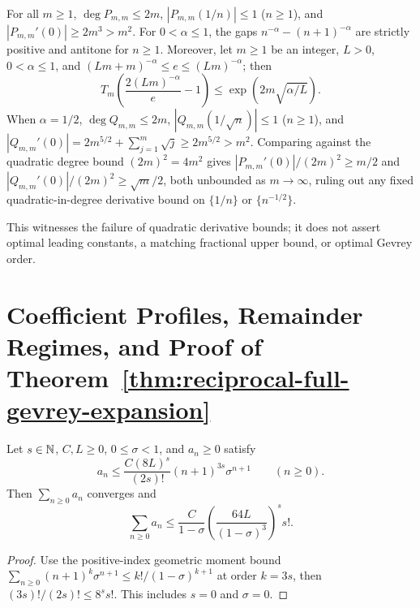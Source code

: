\begin{theorem}
\label{thm:fractional-sharpness}
\leanok
For all $m \ge 1$, $\deg P_{m,m} \le 2m$, $|P_{m,m}(1/n)| \le 1$ ($n \ge 1$), and $|P_{m,m}'(0)| \ge 2m^3 > m^2$. For $0 < \alpha \le 1$, the gaps $n^{-\alpha} - (n+1)^{-\alpha}$ are strictly positive and antitone for $n \ge 1$. Moreover, let $m \ge 1$ be an integer, $L > 0$, $0 < \alpha \le 1$, and $(Lm + m)^{-\alpha} \le e \le (Lm)^{-\alpha}$; then
\[
  T_m\!\left(\frac{2(Lm)^{-\alpha}}{e} - 1\right) \le \exp\!\left(2m\sqrt{\alpha/L}\right).
\]
When $\alpha = 1/2$, $\deg Q_{m,m} \le 2m$, $|Q_{m,m}(1/\sqrt{n})| \le 1$ ($n \ge 1$), and $|Q_{m,m}'(0)| = 2m^{5/2} + \sum_{j=1}^m \sqrt{j} \ge 2m^{5/2} > m^2$. Comparing against the quadratic degree bound $(2m)^2 = 4m^2$ gives $|P_{m,m}'(0)| / (2m)^2 \ge m/2$ and $|Q_{m,m}'(0)| / (2m)^2 \ge \sqrt{m}/2$, both unbounded as $m \to \infty$, ruling out any fixed quadratic-in-degree derivative bound on $\{1/n\}$ or $\{n^{-1/2}\}$.
\end{theorem}

This witnesses the failure of quadratic derivative bounds; it does not assert optimal leading constants, a matching fractional upper bound, or optimal Gevrey order.

\section{Coefficient Profiles, Remainder Regimes, and Proof of Theorem~\ref{thm:reciprocal-full-gevrey-expansion}}
\label{sec:gevrey-proof}

\begin{lemma}
\label{lem:cubic-geometric-gevrey}
\leanok
Let $s\in\mathbb{N}$, $C,L\ge0$, $0\le\sigma<1$, and $a_n\ge0$ satisfy
\[
a_n\le \frac{C(8L)^s}{(2s)!}(n+1)^{3s}\sigma^{n+1}
\qquad(n\ge0).
\]
Then $\sum_{n\ge0}a_n$ converges and
\[
\sum_{n\ge0}a_n\le
\frac{C}{1-\sigma}\left(\frac{64L}{(1-\sigma)^3}\right)^s s!.
\]
\end{lemma}
\begin{proof}
Use the positive-index geometric moment bound $\sum_{n\ge0}(n+1)^k \sigma^{n+1} \le k! / (1-\sigma)^{k+1}$ at order $k = 3s$, then $(3s)!/(2s)!\le8^s s!$. This includes $s=0$ and $\sigma=0$.
\end{proof}

